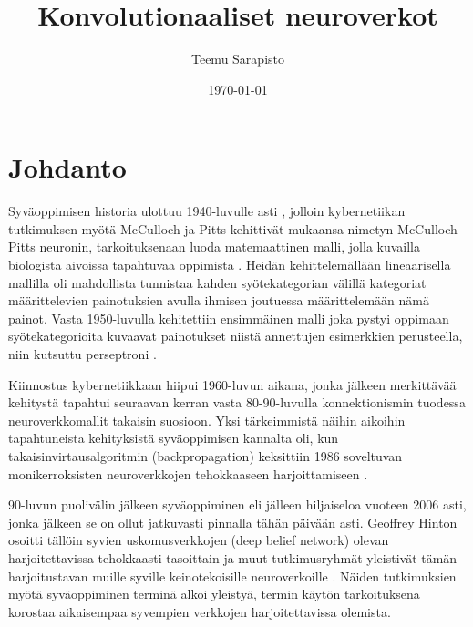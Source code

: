\documentclass[finnish]{tktltiki2}
\title{Konvolutionaaliset neuroverkot}
\author{Teemu Sarapisto}
\date{\today}
\theoremstyle{definition}
\theoremstyle{remark}
\begin{document}

  \frontmatter      %

  \maketitle        %
  \makeabstract     %

  \tableofcontents  %


  \mainmatter       %

  \section{Johdanto}
   Syväoppimisen historia ulottuu 1940-luvulle asti \cite{Goodfellow-et-al-2016}, jolloin kybernetiikan tutkimuksen myötä McCulloch ja Pitts kehittivät mukaansa nimetyn McCulloch-Pitts neuronin, tarkoituksenaan luoda matemaattinen malli, jolla kuvailla biologista aivoissa tapahtuvaa oppimista \cite{mcculloch1943logical}. Heidän kehittelemällään lineaarisella mallilla oli mahdollista tunnistaa kahden syötekategorian välillä kategoriat määrittelevien painotuksien avulla ihmisen joutuessa määrittelemään nämä painot. Vasta 1950-luvulla kehitettiin ensimmäinen malli joka pystyi oppimaan syötekategorioita kuvaavat painotukset niistä annettujen esimerkkien perusteella, niin kutsuttu perseptroni \cite{rosenblatt1957perceptron}.

  Kiinnostus kybernetiikkaan hiipui 1960-luvun aikana, jonka jälkeen merkittävää kehitystä tapahtui seuraavan kerran vasta 80-90-luvulla konnektionismin tuodessa neuroverkkomallit takaisin suosioon. Yksi tärkeimmistä näihin aikoihin tapahtuneista kehityksistä syväoppimisen kannalta oli, kun takaisinvirtausalgoritmin (backpropagation) keksittiin 1986 soveltuvan monikerroksisten neuroverkkojen tehokkaaseen harjoittamiseen \cite{Rumelhart-1986-back-prop}.

  90-luvun puolivälin jälkeen syväoppiminen eli jälleen hiljaiseloa vuoteen 2006 asti, jonka jälkeen se on ollut jatkuvasti pinnalla tähän päivään asti. Geoffrey Hinton osoitti tällöin syvien uskomusverkkojen (deep belief network) olevan harjoitettavissa tehokkaasti tasoittain ja muut tutkimusryhmät yleistivät tämän harjoitustavan muille syville keinotekoisille neuroverkoille \cite{Hinton-et-al-06}. Näiden tutkimuksien myötä syväoppiminen terminä alkoi yleistyä, termin käytön tarkoituksena korostaa aikaisempaa syvempien verkkojen harjoitettavissa olemista.
\end{document}
